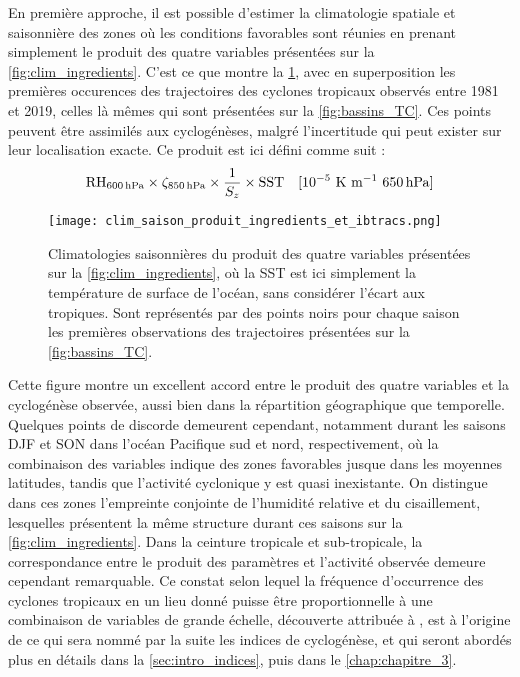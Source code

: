 \documentclass[../main.tex]{subfiles}
\begin{document}
En première approche, il est possible d'estimer la climatologie spatiale et saisonnière des zones où les conditions favorables sont réunies en prenant
simplement le produit des quatre variables présentées sur la \cref{fig:clim_ingredients}. C'est ce que montre la \cref{fig:produit_ingredients}, avec en
superposition les premières occurences des trajectoires des cyclones tropicaux observés entre 1981 et 2019, celles là mêmes qui sont présentées sur la
\cref{fig:bassins_TC}. Ces points peuvent être assimilés aux cyclogénèses, malgré l'incertitude qui peut exister sur leur localisation exacte. Ce produit est ici défini comme suit :
\begin{equation*}
    \text{RH}_{\hPa{600}} \times \zeta_{\hPa{850}} \times \frac{1}{S_z} \times \text{SST} \quad \text{[$10^{-5}$ K m$^{-1}$ \hPa{650}}]
\end{equation*}
\begin{figure}[tbp]
    \centering
    \texttt{[image: clim\_saison\_produit\_ingredients\_et\_ibtracs.png]}
    \caption{Climatologies saisonnières du produit des quatre variables présentées sur la \cref{fig:clim_ingredients}, où la SST est ici simplement la
    température de surface de l'océan, sans considérer l'écart aux tropiques. Sont représentés par des points noirs pour chaque saison les premières
    observations des trajectoires présentées sur la \cref{fig:bassins_TC}.}
    \label{fig:produit_ingredients}
\end{figure}
\noindent Cette figure montre un excellent accord entre le produit des quatre variables et la cyclogénèse observée, aussi bien dans la répartition
géographique que temporelle. Quelques points de discorde demeurent cependant, notamment durant les saisons DJF et SON dans l'océan Pacifique sud et nord,
respectivement, où la combinaison des variables indique des zones favorables jusque dans les moyennes latitudes, tandis que l'activité cyclonique y est quasi
inexistante. On distingue dans ces zones l'empreinte conjointe de l'humidité relative et du cisaillement, lesquelles présentent la même structure durant ces
saisons sur la \cref{fig:clim_ingredients}. Dans la ceinture tropicale et sub-tropicale, la correspondance entre le produit des paramètres et l'activité
observée demeure cependant remarquable. Ce constat selon lequel la fréquence d'occurrence des cyclones tropicaux en un lieu donné puisse être proportionnelle à
une combinaison de variables de grande échelle, découverte attribuée à \cite{gray_tropical_1975}, est à l'origine de ce qui sera nommé par la suite les indices
de cyclogénèse, et qui seront abordés plus en détails dans la \cref{sec:intro_indices}, puis dans le \cref{chap:chapitre_3}.
\end{document}
